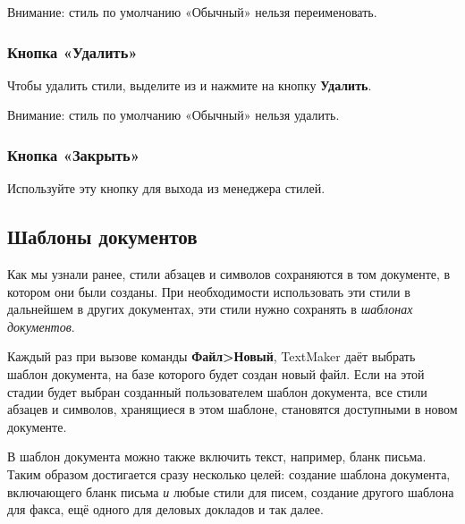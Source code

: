 \documentclass[a4paper,10pt]{article}
\begin{document}
Внимание: стиль по умолчанию «Обычный» нельзя переименовать.

\subsubsection{Кнопка «Удалить»}
Чтобы удалить стили, выделите из и нажмите на кнопку \textbf{Удалить}.

Внимание: стиль по умолчанию «Обычный» нельзя удалить.

\subsubsection{Кнопка «Закрыть»}
Используйте эту кнопку для выхода из менеджера стилей.

\subsection{Шаблоны документов}
Как мы узнали ранее, стили абзацев и символов сохраняются в том документе, в котором они были созданы. При необходимости использовать эти стили в дальнейшем в других документах, эти стили нужно сохранять в \textit{шаблонах документов}.

Каждый раз при вызове команды \textbf{Файл>Новый}, TextMaker даёт выбрать шаблон документа, на базе которого будет создан новый файл. Если на этой стадии будет выбран  созданный пользователем шаблон документа, все стили абзацев и символов, хранящиеся в этом шаблоне, становятся доступными в новом документе.

В шаблон документа можно также включить текст, например, бланк письма. Таким образом достигается сразу несколько целей: создание шаблона документа, включающего бланк письма \textit{и} любые стили для писем, создание другого шаблона для факса, ещё одного для деловых докладов и так далее.
\end{document}
